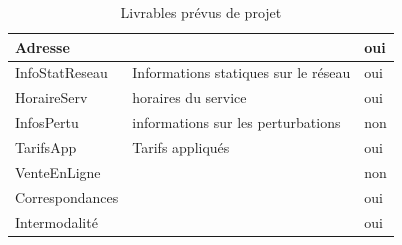 \documentclass[a4paper]{report}
\begin{document}
\begin{doublespace}
\begin{table}[H]
\begin{center}
\begin{tabularx}{17.5cm}{|p{2.5cm}|X|p{3.5cm}|}
				\hline
				Adresse                                      &                                                     & oui           \\
				\hline
				InfoStatReseau                               & Informations statiques sur le réseau                &
				oui                                                                                                                \\
				\hline
				HoraireServ                                  & horaires du service                                 & oui           \\
				\hline
				InfosPertu                                   & informations sur les perturbations                  & non           \\
				\hline
				TarifsApp                                    & Tarifs appliqués                                    & oui           \\
				\hline
				VenteEnLigne                                 &                                                     & non           \\
				\hline
				Correspondances                              &                                                     & oui           \\
				\hline
				Intermodalité                                &                                                     & oui           \\
				\hline
			\end{tabularx}
			\caption{Livrables prévus de projet}
		\end{center}
	\end{table}
	

\end{doublespace}
\end{document}
